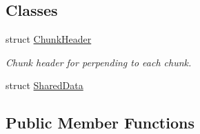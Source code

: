 \subsection*{Classes}
\begin{DoxyCompactItemize}
\item 
struct \hyperlink{structMemoryPoolAllocator_1_1ChunkHeader}{Chunk\+Header}
\begin{DoxyCompactList}\small\item\em Chunk header for perpending to each chunk. \end{DoxyCompactList}\item 
struct \hyperlink{structMemoryPoolAllocator_1_1SharedData}{Shared\+Data}
\end{DoxyCompactItemize}
\subsection*{Public Member Functions}
